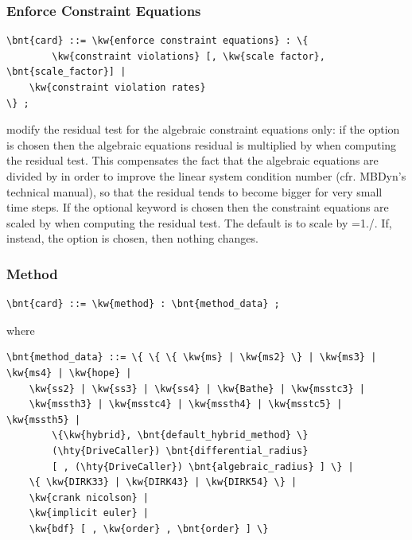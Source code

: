 \subsubsection{Enforce Constraint Equations}
\begin{Verbatim}[commandchars=\\\{\}]
    \bnt{card} ::= \kw{enforce constraint equations} : \{
    	\kw{constraint violations} [, \kw{scale factor}, \bnt{scale_factor}] | 
	\kw{constraint violation rates} 
\} ;
\end{Verbatim}
modify the residual test for the algebraic constraint equations only:
if the option  is chosen then the algebraic equations
residual is multiplied by  when computing the residual test.
This compensates the fact that the algebraic equations are divided by 
 in order to improve the linear system condition number (cfr. MBDyn's
technical manual), so that the residual tends to become bigger for very small time steps.
If the optional keyword  is chosen then 
the constraint equations are scaled by  when computing the residual test.
The default is to scale by =1./.
If, instead, the option  is chosen, then nothing changes.

\subsubsection{Method}
\begin{Verbatim}[commandchars=\\\{\}]
    \bnt{card} ::= \kw{method} : \bnt{method_data} ;
\end{Verbatim}

where

\begin{Verbatim}[commandchars=\\\{\}]
    \bnt{method_data} ::= \{ \{ \{ \kw{ms} | \kw{ms2} \} | \kw{ms3} | \kw{ms4} | \kw{hope} |
    \kw{ss2} | \kw{ss3} | \kw{ss4} | \kw{Bathe} | \kw{msstc3} | 
    \kw{mssth3} | \kw{msstc4} | \kw{mssth4} | \kw{msstc5} | \kw{mssth5} |
        \{\kw{hybrid}, \bnt{default_hybrid_method} \} 
        (\hty{DriveCaller}) \bnt{differential_radius}
        [ , (\hty{DriveCaller}) \bnt{algebraic_radius} ] \} | 
    \{ \kw{DIRK33} | \kw{DIRK43} | \kw{DIRK54} \} |
    \kw{crank nicolson} | 
    \kw{implicit euler} | 
    \kw{bdf} [ , \kw{order} , \bnt{order} ] \}
\end{Verbatim}

